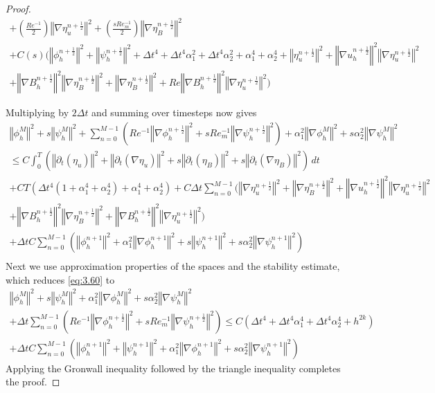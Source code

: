 \documentclass[11pt]{article}%
\numberwithin{equation}{section}
\newcommand{\norm}[1]{\left\Vert#1\right\Vert}
\def\grad{{\nabla}}
\def\nplushalf{{n+\frac12}}
\begin{document}
\begin{proof}
\begin{multline}
	+ \left(\frac{Re^{-1}}{2}\right)\norm{\grad{\eta}^{\nplushalf}_{u}}^{2}
	+ \left(\frac{sRe^{-1}_{m}}{2}\right)\norm{\grad{\eta^{\nplushalf}_{B}}}^{2}\\
	+C(s)(\norm{\phi_h^{\nplushalf}}^2 + \norm{\psi_h^{\nplushalf}}^2 
	+ \Delta t^4+\Delta t^4 \alpha_1^2 +\Delta t^4 \alpha_2^2 + \alpha_1^4 + \alpha_2^4
	+ \norm{\eta_u^{\nplushalf}}^2 + \norm{\nabla u_h^{\nplushalf}}^2\norm{\nabla \eta_u^{\nplushalf}}^2\\
	+ \norm{\nabla B_h^{\nplushalf}}^2\norm{\nabla \eta_B^{\nplushalf}}^2 
	+  \norm{\nabla \eta_B^{\nplushalf}}^2
	+ Re \norm{\nabla B_h^{\nplushalf}}^2\norm{\nabla \eta_u^{\nplushalf}}^2
	)
	\label{eq:3.59}
	\end{multline}

         Multiplying by $2\Delta t$ and summing over timesteps now gives
         	\begin{multline}
	\norm{\phi^{M}_{h}}^{2}  + s\norm{\psi^{M}_{h}}^{2}
          + \sum_{n=0}^{M-1} \left( Re^{-1}\norm{\nabla \phi^{\nplushalf}_{h}}^{2} +
	 	 sRe^{-1}_{m}\norm{\grad{\psi^{n+\frac12}_{h}}}^{2} \right)+\alpha_1^2\norm{\grad{\phi_h^M}}^2+s\alpha_2^2\norm{\grad{\psi_h^M}}^2 \\
	\leq
	C\int^{T}_{0} \left( \norm{\partial_{t}(\eta_{u})}^{2} + \norm{\partial_{t}(\grad{\eta}_{u})}^{2} + s \norm{\partial_{t}(\eta_{B})}^{2} +s \norm{\partial_{t}(\grad{\eta}_{B})}^{2}\right) \, dt\\
	+ CT(\Delta t^4(1+\alpha_1^4+\alpha_2^4) + \alpha_1^4 + \alpha_2^4 ) 
	+ C\Delta t \sum_{n=0}^{M-1}( \norm{\nabla \eta^{\nplushalf}_{u}}^{2}
		+ \norm{\grad{\eta^{\nplushalf}_{B}}}^{2} 
		+ \norm{\nabla u_h^{\nplushalf}}^2\norm{\nabla \eta_u^{\nplushalf}}^2\\
		+ \norm{\nabla B_h^{\nplushalf}}^2\norm{\nabla \eta_B^{\nplushalf}}^2
		+ \norm{\nabla B_h^{\nplushalf}}^2\norm{\nabla \eta_u^{\nplushalf}}^2
	) \\
	+ \Delta t C\sum_{n=0}^{M-1}\left(\norm{\phi_h^{n+1}}^2+\alpha_1^2\norm{\grad{\phi}_h^{n+1}}^2 + s\norm{\psi_h^{n+1}}^2 + s\alpha_2^2\norm{\grad{\psi}_h^{n+1}}^2\right )\\
	\label{eq:3.60}
	\end{multline}
         Next we use approximation properties of the spaces and the stability estimate, which reduces \eqref{eq:3.60} to
         	\begin{multline}
	\norm{\phi^{M}_{h}}^{2}  + s\norm{\psi^{M}_{h}}^{2}+\alpha_1^2\norm{\grad{\phi_h^M}}^2
	+s\alpha_2^2\norm{\grad{\psi_h^M}}^2 \\
          +\Delta t \sum_{n=0}^{M-1} \left( Re^{-1}\norm{\nabla \phi^{\nplushalf}_{h}}^{2} +
	 	 sRe^{-1}_{m}\norm{\grad{\psi^{n+\frac12}_{h}}}^{2} \right)
	\leq
	C(\Delta t^4 + \Delta t^4 \alpha_1^4 +\Delta t^4 \alpha_2^4 + h^{2k})
\\	+ \Delta t C\sum_{n=0}^{M-1}\left(\norm{\phi_h^{n+1}}^2 + \norm{\psi_h^{n+1}}^2+\alpha_1^2\norm{\grad{\phi}_h^{n+1}}^2 +s\alpha_2^2\norm{\grad{\psi}_h^{n+1}}^2 \right)
	\label{eq:3.61}
	\end{multline}
	Applying the Gronwall inequality followed by the triangle inequality completes the proof.

\end{proof}
\end{document}
